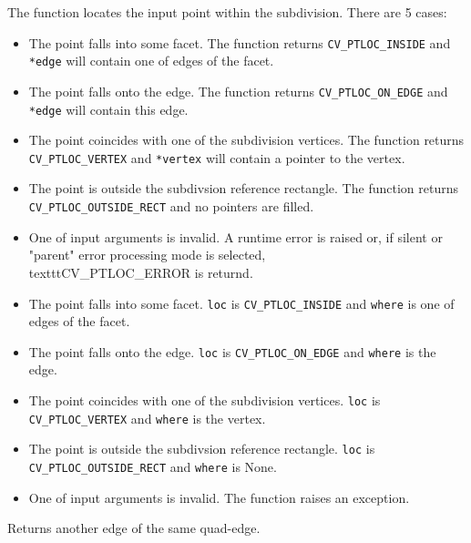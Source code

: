 The function locates the input point within the subdivision. There are 5 cases:

\ifC
\begin{itemize}
 \item The point falls into some facet. The function returns \texttt{CV\_PTLOC\_INSIDE} and \texttt{*edge} will contain one of edges of the facet.
 \item The point falls onto the edge. The function returns \texttt{CV\_PTLOC\_ON\_EDGE} and \texttt{*edge} will contain this edge.
 \item The point coincides with one of the subdivision vertices. The function returns \texttt{CV\_PTLOC\_VERTEX} and \texttt{*vertex} will contain a pointer to the vertex.
 \item The point is outside the subdivsion reference rectangle. The function returns \texttt{CV\_PTLOC\_OUTSIDE\_RECT} and no pointers are filled.
 \item One of input arguments is invalid. A runtime error is raised or, if silent or "parent" error processing mode is selected, \\texttt{CV\_PTLOC\_ERROR} is returnd.
\end{itemize}
\fi

\ifPy
\begin{itemize}
 \item The point falls into some facet.                          \texttt{loc} is \texttt{CV\_PTLOC\_INSIDE} and \texttt{where} is one of edges of the facet.
 \item The point falls onto the edge.                            \texttt{loc} is \texttt{CV\_PTLOC\_ON\_EDGE} and \texttt{where} is the edge.
 \item The point coincides with one of the subdivision vertices. \texttt{loc} is \texttt{CV\_PTLOC\_VERTEX} and \texttt{where} is the vertex.
 \item The point is outside the subdivsion reference rectangle.  \texttt{loc} is \texttt{CV\_PTLOC\_OUTSIDE\_RECT} and \texttt{where} is None.
 \item One of input arguments is invalid. The function raises an exception.
\end{itemize}
\fi

Returns another edge of the same quad-edge.


